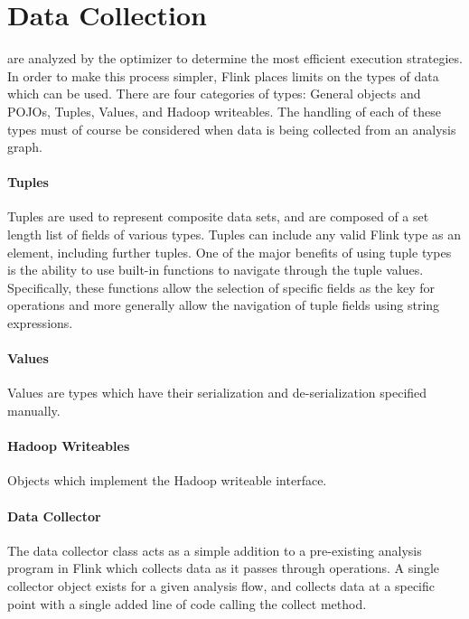 \section{Data Collection}
\label{sec:data_collection}
 are analyzed by the optimizer to determine the most efficient execution strategies. In order to make this process simpler, Flink places limits on the types of data which can be used. There are four categories of types: General objects and POJOs, Tuples, Values, and Hadoop writeables. The handling of each of these types must of course be considered when data is being collected from an analysis graph.

\paragraph{Tuples}
Tuples are used to represent composite data sets, and are composed of a set length list of fields of various types. Tuples can include any valid Flink type as an element, including further tuples. One of the major benefits of using tuple types is the ability to use built-in functions to navigate through the tuple values. Specifically, these functions allow the selection of specific fields as the key for operations and more generally allow the navigation of tuple fields using string expressions.

\paragraph{Values}
Values are types which have their serialization and de-serialization specified manually.

\paragraph{Hadoop Writeables}
Objects which implement the Hadoop writeable interface.

\paragraph{Data Collector}
The data collector class acts as a simple addition to a pre-existing analysis program in Flink which collects data as it passes through operations. A single collector object exists for a given analysis flow, and collects data at a specific point with a single added line of code calling the collect method.

